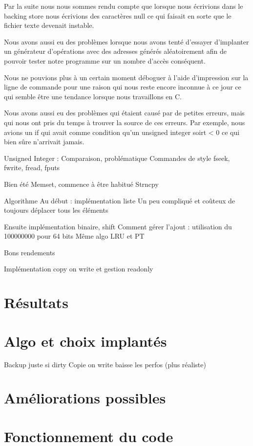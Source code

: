 \documentclass{article}
\begin{document}
Par la suite nous nous sommes rendu compte que lorsque nous écrivions dans le backing store nous écrivions des caractères null ce qui faisait en sorte que le fichier texte devenait instable. 
\par
Nous avons aussi eu des problèmes lorsque nous avons tenté d'essayer d'implanter un générateur d'opérations avec des adresses générés aléatoirement afin de pouvoir tester notre programme sur un nombre d'accès conséquent. 
\par
Nous ne pouvions plus à un certain moment déboguer à l'aide d'impression sur la ligne de commande pour une raison qui nous reste encore inconnue à ce jour ce qui semble être une tendance lorsque nous travaillons en C. 
\par
Nous avons aussi  eu des problèmes qui étaient causé par de petites erreurs, mais qui nous ont pris du temps à trouver la source de ces erreurs. Par exemple, nous avions un if qui avait comme condition qu'un unsigned integer soirt < 0 ce qui bien sûre n'arrivait jamais.
\par

Unsigned Integer : Comparaison, problématique
Commandes de style fseek, fwrite, fread, fputs

Bien été
Memset, commence à être habitué
Strncpy

Algorithme
Au début : implémentation liste 
Un peu compliqué  et  coûteux de toujours déplacer tous les éléments

Ensuite implémentation binaire, shift
Comment gérer l’ajout : utilisation du 100000000 pour 64 bits 
Même algo LRU et PT

Bons rendements

Implémentation copy on write et gestion readonly

\section{Résultats}


\section{Algo et choix implantés}
Backup juste si dirty
Copie on write baisse les perfos (plus réaliste)
\section{Améliorations possibles}


\section{Fonctionnement du code}
\end{document}
